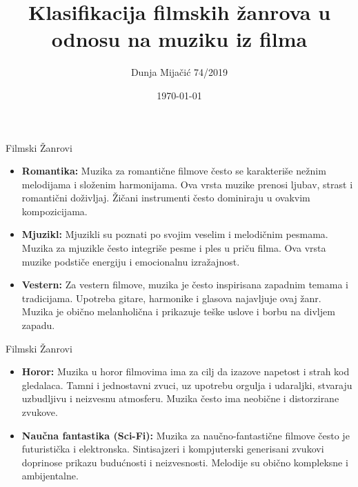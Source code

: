 \documentclass{beamer}
\title{Klasifikacija filmskih žanrova u odnosu na muziku iz filma}
\author{Dunja Mijačić 74/2019}
\date{\today}
\begin{document}
\frame{\titlepage} 

\begin{frame}{Filmski Žanrovi}
\begin{itemize}
\item \textbf{Romantika:} Muzika za romantične filmove često se karakteriše nežnim melodijama i složenim harmonijama. Ova vrsta muzike prenosi ljubav, strast i romantični doživljaj. Žičani instrumenti često dominiraju u ovakvim kompozicijama.

\item \textbf{Mjuzikl:} Mjuzikli su poznati po svojim veselim i melodičnim pesmama. Muzika za mjuzikle često integriše pesme i ples u priču filma. Ova vrsta muzike podstiče energiju i emocionalnu izražajnost.

\item \textbf{Vestern:} Za vestern filmove, muzika je često inspirisana zapadnim temama i tradicijama. Upotreba gitare, harmonike i glasova najavljuje ovaj žanr. Muzika je obično melanholična i prikazuje teške uslove i borbu na divljem zapadu.

\end{itemize}
\end{frame}

\begin{frame}{Filmski Žanrovi}
\begin{itemize}
\item \textbf{Horor:} Muzika u horor filmovima ima za cilj da izazove napetost i strah kod gledalaca. Tamni i jednostavni zvuci, uz upotrebu orgulja i udaraljki, stvaraju uzbudljivu i neizvesnu atmosferu. Muzika često ima neobične i distorzirane zvukove.

\item \textbf{Naučna fantastika (Sci-Fi):} Muzika za naučno-fantastične filmove često je futuristička i elektronska. Sintisajzeri i kompjuterski generisani zvukovi doprinose prikazu budućnosti i neizvesnosti. Melodije su obično kompleksne i ambijentalne.
\end{itemize}
\end{frame}
\end{document}
